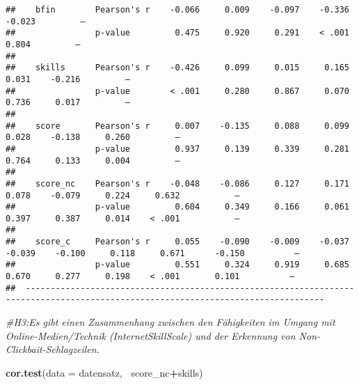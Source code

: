 \documentclass[]{article}
\newenvironment{Shaded}{\begin{snugshade}}{\end{snugshade}}
\newcommand{\KeywordTok}[1]{\textcolor[rgb]{0.13,0.29,0.53}{\textbf{#1}}}
\newcommand{\DataTypeTok}[1]{\textcolor[rgb]{0.13,0.29,0.53}{#1}}
\newcommand{\CommentTok}[1]{\textcolor[rgb]{0.56,0.35,0.01}{\textit{#1}}}
\newcommand{\OperatorTok}[1]{\textcolor[rgb]{0.81,0.36,0.00}{\textbf{#1}}}
\newcommand{\NormalTok}[1]{#1}
\begin{document}
\begin{verbatim}
##    bfin        Pearson's r    -0.066     0.009    -0.097    -0.336    -0.023         —                                              
##                p-value         0.475     0.920     0.291    < .001     0.804         —                                              
##                                                                                                                                     
##    skills      Pearson's r    -0.426     0.099     0.015     0.165     0.031    -0.216         —                                    
##                p-value        < .001     0.280     0.867     0.070     0.736     0.017         —                                    
##                                                                                                                                     
##    score       Pearson's r     0.007    -0.135     0.088     0.099     0.028    -0.138     0.260         —                          
##                p-value         0.937     0.139     0.339     0.281     0.764     0.133     0.004         —                          
##                                                                                                                                     
##    score_nc    Pearson's r    -0.048    -0.086     0.127     0.171     0.078    -0.079     0.224     0.632           —              
##                p-value         0.604     0.349     0.166     0.061     0.397     0.387     0.014    < .001           —              
##                                                                                                                                     
##    score_c     Pearson's r     0.055    -0.090    -0.009    -0.037    -0.039    -0.100     0.118     0.671      -0.150          —   
##                p-value         0.551     0.324     0.919     0.685     0.670     0.277     0.198    < .001       0.101          —   
##  ----------------------------------------------------------------------------------------------------------------------------------
\end{verbatim}

\begin{Shaded}
\begin{Highlighting}[]
\CommentTok{#H3:Es gibt einen Zusammenhang zwischen den Fähigkeiten im Umgang mit Online-Medien/Technik (InternetSkillScale) und der Erkennung von Non-Clickbait-Schlagzeilen.}


\KeywordTok{cor.test}\NormalTok{(}\DataTypeTok{data =}\NormalTok{ datensatz, }\OperatorTok{~}\NormalTok{score_nc}\OperatorTok{+}\NormalTok{skills)}
\end{Highlighting}
\end{Shaded}
\end{document}
